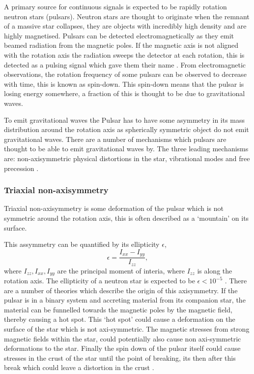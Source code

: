 A primary source for continuous signals is expected to be rapidly rotation neutron stars (pulsars).
Neutron stars are thought to originate when the remnant of a massive star collapses, they are objects with incredibly high density and are highly magnetised.
Pulsars can be detected electromagnetically as they emit beamed radiation from the magnetic poles.
If the magnetic axis is not aligned with the rotation axis the radiation sweeps the detector at each rotation, this is detected as a pulsing signal which gave them their name \cite{lyne_graham-smith_2012}.
From electromagnetic observations, the rotation frequency of some pulsars can be observed to decrease with time, this is known as spin-down.
This spin-down means that the pulsar is losing energy somewhere, a fraction of this is thought to be due to gravitational waves. 

To emit gravitational waves the Pulsar has to have some asymmetry in its mass distribution around the rotation axis as spherically symmetric object do not emit gravitational waves.
There are a number of mechanisms which pulsars are thought to be able to emit gravitational waves by. The three leading mechanisms are: non-axisymmetric physical distortions in the star, vibrational modes and free precession \cite{Becker2009}.

\subsubsection{Triaxial non-axisymmetry}

Triaxial non-axisymmetry is some deformation of the pulsar which is not symmetric around the rotation axis, this is often described as a `mountain' on its surface.

This assymmetry can be quantified by its ellipticity $\epsilon$,
\begin{equation}
\label{ellipticity}
\epsilon = \frac{I_{xx}-I_{yy}}{I_{zz}},
\end{equation}
where $I_{zz},I_{xx},I_{yy}$ are the principal moment of interia, where $I_{zz}$ is along the rotation axis. 
The ellipticity of a neutron star is expected to be $ \epsilon<10^{-5}$ \cite{Becker2009}. 
There are a number of theories which describe the origin of this axisymmetry.
If the pulsar is in a binary system and accreting material from its companion star, the material can be funnelled towards the magnetic poles by the magnetic field, thereby causing a hot spot.
This `hot spot' could cause a deformation on the surface of the star which is not axi-symmetric. 
The magnetic stresses from strong magnetic fields within the star, could potentially also cause non axi-symmetric deformations to the star.
Finally the spin down of the pulsar itself could cause stresses in the crust of the star until the point of breaking, its then after this break which could leave a distortion in the crust \cite{Becker2009}.

